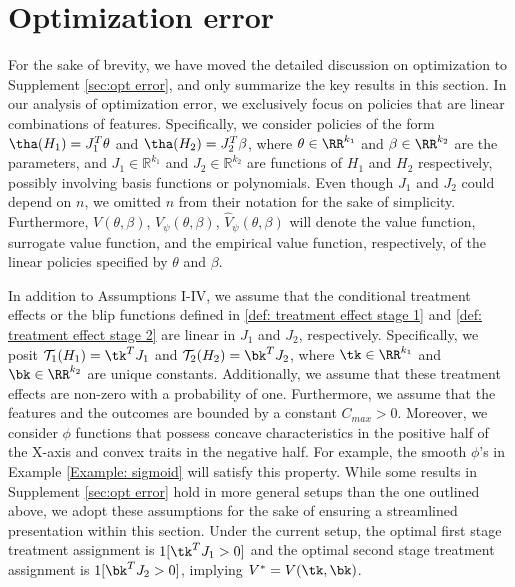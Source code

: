 \documentclass[preprint] {imsart}
\begin{document}
  
{\color{black}
\section{Optimization error}
\label{sec: opt: summary}
 For the sake of brevity, we have moved the detailed discussion on optimization to Supplement \ref{sec:opt error}, and only summarize the key results in this section. In our analysis of optimization error, we exclusively focus on policies that are linear combinations of features. Specifically, we consider policies of the form $\tha(H_1)=J_1^T\theta$ and $\tha(H_2)=J_2^T\beta$, where $\theta\in\RR^{k_1}$ and $\beta\in\RR^{k_2}$ are the parameters, and $J_1 \in \mathbb{R}^{k_1}$ and $J_2 \in \mathbb{R}^{k_2}$ are functions of  $H_1$ and $H_2$ respectively, possibly involving basis functions or polynomials.  Even though $J_1$ and $J_2$ could depend on $n$, we omitted $n$ from their notation for the sake of simplicity. 
Furthermore, $V(\theta,\beta)$, $V_\psi(\theta,\beta)$, $\widehat V_\psi(\theta,\beta)$ will denote the value function, surrogate value function, and the empirical value function, respectively, of  the linear policies specified by $\theta$ and $\beta$.

  In addition to Assumptions I-IV, we assume that the conditional treatment effects or the blip functions defined in \eqref{def: treatment effect stage 1} and \eqref{def: treatment effect stage 2} are linear in $J_1$ and $J_2$, respectively. Specifically, we posit $\mathcal T_1(H_1)=\tk^TJ_1$ and $\mathcal T_2(H_2)=\bk^T J_2$, where $\tk\in\RR^{k_1}$ and $\bk\in\RR^{k_2}$ are unique constants.  Additionally, we assume that these treatment effects are non-zero with a probability of one.
  Furthermore, we assume that the features and the outcomes are bounded by a constant $C_{max}>0$.  Moreover, we consider $\phi$ functions that possess concave characteristics in the positive half of the X-axis and convex traits in the negative half. For example, the smooth $\phi$'s in Example \ref{Example: sigmoid} will satisfy this property. While some  results in Supplement \ref{sec:opt error} hold in more general setups than the one outlined above, we adopt these assumptions for the sake of ensuring a streamlined presentation within this section. Under the current setup, the optimal first stage treatment assignment is $1[\tk^TJ_1>0]$ and the optimal second stage treatment assignment is $1[\bk^TJ_2>0]$, implying $V^*=V(\tk,\bk)$.

}
\end{document}
